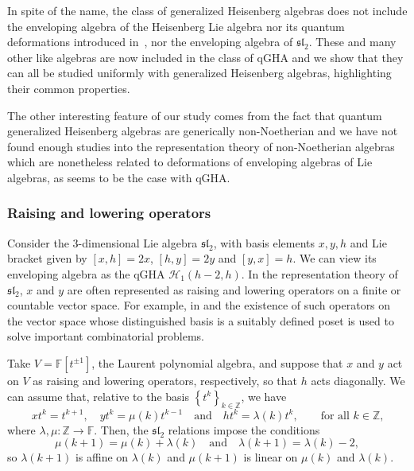 \documentclass{commat}
\newcommand{\FF}{\mathbb{F}}
\newcommand{\ZZ}{\mathbb{Z}}
\newcommand{\hh}{\mathcal{H}}
\begin{document}
In spite of the name, the class of generalized Heisenberg algebras does not include the enveloping algebra of the Heisenberg Lie algebra nor its quantum deformations introduced in~\cite{KS93}, nor the enveloping algebra of $\mathfrak{sl}_2$. These and many other like algebras are now included in the class of qGHA and we show that they can all be studied uniformly with generalized Heisenberg algebras, highlighting their common properties.

The other interesting feature of our study comes from the fact that quantum generalized Heisenberg algebras are generically non-Noetherian and we have not found enough studies into the representation theory of non-Noetherian algebras which are nonetheless related to deformations of enveloping algebras of Lie algebras, as seems to be the case with qGHA. 

\subsubsection{Raising and lowering operators}\label{SS:intro:raiselower}

Consider the $3$-dimensional Lie algebra $\mathfrak{sl}_2$, with basis elements $x, y, h$ and Lie bracket given by $[x,h]=2x$, $[h,y]=2y$ and $[y,x]=h$. We can view its enveloping algebra as the qGHA $\hh_1(h-2, h)$. In the representation theory of $\mathfrak{sl}_2$, $x$ and $y$ are often represented as  raising and lowering operators on a finite or countable vector space. For example, in \cite{P82} and \cite{rS88} the existence of such operators on the vector space whose distinguished basis is a suitably defined poset is used to solve important combinatorial problems.

Take $V=\FF[t^{\pm 1}]$, the Laurent polynomial algebra, and suppose that $x$ and $y$ act on $V$ as raising and lowering operators, respectively, so that $h$ acts diagonally. We can assume that, relative to the basis $\left\{t^k\right\}_{k\in\ZZ}$, we have
\begin{equation}\label{E:intro:raislowLaurent}
	x t^k=t^{k+1},\quad  yt^k=\mu(k)t^{k-1}\quad  \mbox{and}\quad  ht^k=\lambda(k)t^{k},\qquad\mbox{for all $k\in\ZZ$,}
\end{equation}
where $\lambda, \mu:\ZZ\longrightarrow\FF$. Then, the $\mathfrak{sl}_2$ relations impose the conditions 
\begin{equation*}
	\mu(k+1)=\mu(k)+\lambda(k) \quad  \mbox{and}\quad \lambda(k+1)=\lambda(k)-2,
\end{equation*}
so $\lambda(k+1)$ is affine on $\lambda(k)$ and $\mu(k+1)$ is linear on $\mu(k)$ and $\lambda(k)$. 
\end{document}
